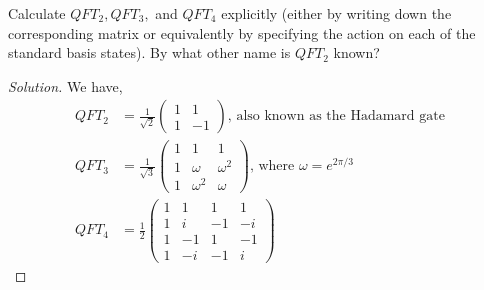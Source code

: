 \begin{solution}[label=ques:2a]
  \begin{question}
    Calculate $QFT_2, QFT_3,$ and $QFT_4$ explicitly (either by writing down the corresponding matrix or equivalently by specifying the action on each of the standard basis states).  By what other name
is $QFT_2$ known?
  \end{question}
  \tcblower{}
  \begin{proof}[Solution]
    We have,
    \begin{equation}
      \begin{split}
        QFT_2 &= \frac{1}{\sqrt{2}}\begin{pmatrix}
          1 & 1 \\
          1 & -1
        \end{pmatrix}\text{, also known as the Hadamard gate} \\
        QFT_3 &= \frac{1}{\sqrt{3}}\begin{pmatrix}
          1 & 1 & 1 \\
          1 & \omega & \omega^2 \\
          1 & \omega^2 & \omega
          \end{pmatrix}\text{, where }\omega = e^{2\pi/3} \\
        QFT_4 &= \frac{1}{2}\begin{pmatrix}
          1 & 1 & 1 & 1 \\
          1 & i & -1 & -i \\
          1 & -1 & 1 & -1 \\
          1 & -i & -1 & i
          \end{pmatrix}
      \end{split}
      \label{eq:qft_comp}
    \end{equation}
  \end{proof}
\end{solution}

